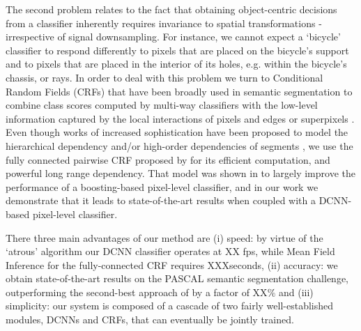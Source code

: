 The second problem relates to the fact that obtaining object-centric decisions from a classifier inherently requires invariance to spatial transformations - irrespective of signal downsampling. For instance, we cannot expect a `bicycle' classifier to respond differently to pixels that are  placed on the bicycle's support and to pixels that are placed in the interior of its holes, e.g. within the bicycle's chassis, or rays. In order to deal with this problem we turn to  Conditional Random Fields (CRFs) that have been broadly used in semantic segmentation to combine class scores computed by multi-way classifiers with the low-level information captured by the local interactions of pixels and edges\citep{rother2004grabcut, shotton2009textonboost} or superpixels \citep{lucchi2011spatial}. Even though works of increased sophistication have been proposed 
 to model the hierarchical dependency \citep{he2004multiscale, ladicky2009associative, lempitsky2011pylon} and/or  high-order dependencies of segments \citep{delong2012fast, gonfaus2010harmony, kohli2009robust, krahenbuhl2011efficient}, we use the  fully connected pairwise CRF proposed by \citet{krahenbuhl2011efficient} for its efficient computation, and powerful long range dependency. That model was shown in  \citet{krahenbuhl2011efficient} to largely improve the performance of a boosting-based pixel-level classifier, and in our work we demonstrate that it leads to state-of-the-art results when coupled with a DCNN-based pixel-level classifier. 


There  three main advantages of our method are (i) speed: by virtue of the `atrous' algorithm our DCNN classifier operates at XX fps, while Mean Field Inference for the fully-connected CRF requires XXXseconds, (ii) accuracy: we obtain state-of-the-art results on the PASCAL semantic segmentation challenge, outperforming the second-best approach of \citet{mostajabi2014feedforward} by a factor of XX$\%$ and (iii) simplicity: our system is composed of a cascade of two fairly well-established modules, DCNNs and CRFs, that can eventually be jointly trained. 


